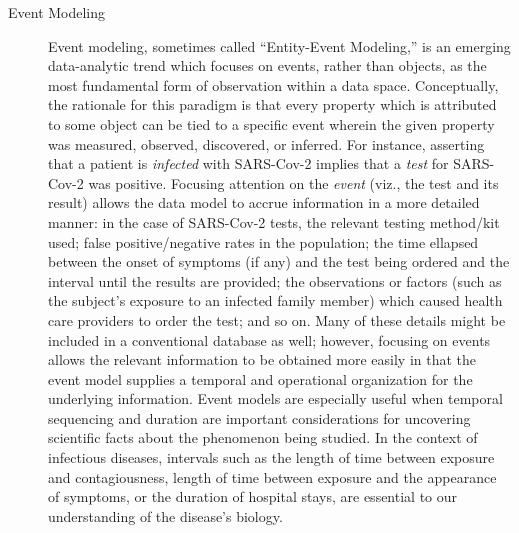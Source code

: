 \documentclass[11pt,letterpaper]{article}
\newcommand{\q}[1]{{\fontfamily{qcr}\selectfont ``}#1{\fontfamily{qcr}\selectfont ''}}
\begin{document}
{{\begin{description}
\item[Event Modeling]  Event modeling, sometimes called 
\q{Entity-Event Modeling,} is an emerging data-analytic 
trend which focuses on events, rather than objects, 
as the most fundamental form of observation within a data 
space.  Conceptually, the rationale for this paradigm 
is that every property which is attributed to 
some object can be tied to a specific event wherein the given property 
was measured, observed, discovered, or inferred.  
For instance, asserting that a patient is 
\textit{infected} with SARS-Cov-2  
implies that a \textit{test} for SARS-Cov-2 
was positive.  Focusing attention on the \textit{event} 
(viz., the test and its result) allows the 
data model to accrue information in a more detailed manner: 
in the case of SARS-Cov-2 tests, the relevant testing method/kit used; false 
positive/negative rates in the population; the time ellapsed between the 
onset of symptoms (if any) and the test being ordered 
and the interval until the results are provided; the observations 
or factors (such as the subject's exposure 
to an infected family member) which 
caused health care providers to order the test; and so on.  
Many of these details might be included in a conventional 
database as well; however, focusing on events allows the 
relevant information to be obtained more easily in that 
the event model supplies a temporal and operational 
organization for the underlying information.  
Event models are especially useful when 
temporal sequencing and duration are important 
considerations for uncovering scientific 
facts about the phenomenon being studied.  In the 
context of infectious diseases, intervals such 
as the length of time between exposure 
and contagiousness, length of time between exposure 
and the appearance of symptoms, or the duration of hospital 
stays, are essential to our understanding of the disease's 
biology. 


\end{description}}}
\end{document}
